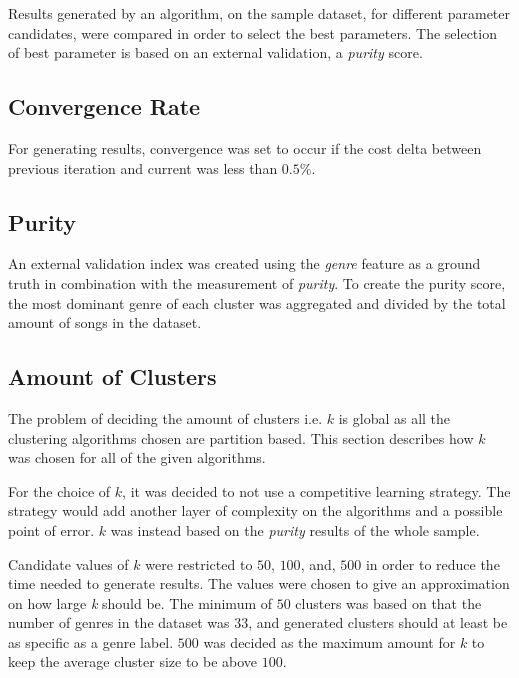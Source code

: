 \documentclass[../report.tex]{subfiles}
\begin{document}
Results generated by an algorithm, on the sample dataset, for different parameter candidates, were compared in order to select the best parameters. The selection of best parameter is based on an external validation, a \textit{purity} score.


\subsection{Convergence Rate}
For generating results, convergence was set to occur if the cost delta between previous iteration and current was less than $0.5\%$.

\subsection{Purity}
An external validation index was created using the \textit{genre} feature as a ground truth in combination with the measurement of \textit{purity}. To create the purity score, the most dominant genre of each cluster was aggregated and divided by the total amount of songs in the dataset.

\subsection{Amount of Clusters}
The problem of deciding the amount of clusters i.e. $k$ is global as all the clustering algorithms chosen are partition based. This section describes how $k$ was chosen for all of the given algorithms.

For the choice of $k$, it was decided to not use a competitive learning strategy. The strategy would add another layer of complexity on the algorithms and a possible point of error. $k$ was instead based on the \textit{purity} results of the whole sample.


Candidate values of $k$ were restricted to $50$, $100$, and, $500$ in order to reduce the time needed to generate results. The values were chosen to give an approximation on how large \textit{k} should be. The minimum of $50$ clusters was based on that the number of genres in the dataset was $33$, and generated clusters should at least be as specific as a genre label. $500$ was decided as the maximum amount for $k$ to keep the average cluster size to be above $100$.
\end{document}
